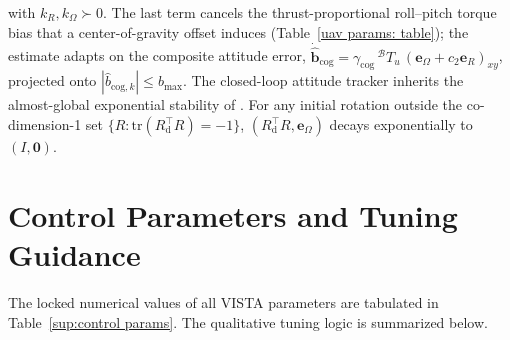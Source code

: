 \documentclass{IEEEtaes}
\theoremstyle{definition}
\theoremstyle{remark}
\begin{document}
with $k_R,k_\Omega\succ 0$. The last term cancels the thrust-proportional roll--pitch torque bias that a center-of-gravity offset induces (Table~\ref{uav params: table}); the estimate adapts on the composite attitude error, $\dot{\hat{\boldsymbol{b}}}_\text{cog} = \gamma_\text{cog}\,^\mathcal{B}T_u\,(\boldsymbol{e}_{\Omega}+c_2\boldsymbol{e}_{R})_{xy}$, projected onto $|\hat{b}_{\text{cog},k}|\le b_{\max}$. The closed-loop attitude tracker inherits the almost-global exponential stability of \cite[Prop.~1]{lee2010}. For any initial rotation outside the co-dimension-1 set $\{R:\text{tr}(R_\text{d}^\top R)=-1\}$, $(R_\text{d}^\top R,\boldsymbol{e}_\Omega)$ decays exponentially to $(I,\boldsymbol{0})$.

\section{Control Parameters and Tuning Guidance} \label{tuning: section}
The locked numerical values of all VISTA parameters are tabulated in Table~\ref{sup:control params}. The qualitative tuning logic is summarized below.
\end{document}
